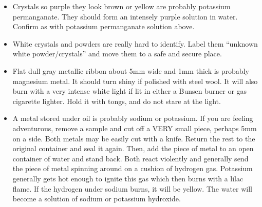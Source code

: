 \begin{itemize}
\item{Crystals so purple they look brown or yellow 
are probably potassium permanganate. 
They should form an intensely purple solution in water. 
Confirm as with potassium permanganate solution above.}

\item{White crystals and powders are really hard to identify. 
Label them “unknown white powder/crystals” 
and move them to a safe and secure place.}

\item{Flat dull gray metallic ribbon about 5mm wide 
and 1mm thick is probably magnesium metal. 
It should turn shiny if polished with steel wool. 
It will also burn with a very intense white light 
if lit in either a Bunsen burner or gas cigarette lighter. 
Hold it with tongs, 
and do not stare at the light.}

\item{A metal stored under oil is probably sodium or potassium. 
If you are feeling adventurous, 
remove a sample and cut off a VERY small piece, 
perhaps 5mm on a side. 
Both metals may be easily cut with a knife. 
Return the rest to the original container and seal it again. 
Then, 
add the piece of metal to an open container of water and stand back. 
Both react violently and generally send the piece of metal 
spinning around on a cushion of hydrogen gas. 
Potassium generally gets hot enough to ignite this gas 
which then burns with a lilac flame. 
If the hydrogen under sodium burns, 
it will be yellow. 
The water will become a solution of sodium or potassium hydroxide.}

\end{itemize}
